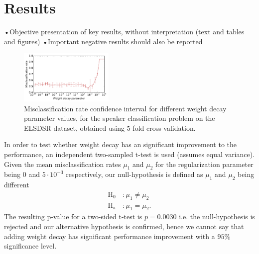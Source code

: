 \section{Results}

•Objective presentation of key results, without interpretation (text and tables
and figures)
•Important negative results should also be reported

\begin{figure}[H]
  \centering
  \includegraphics[width=0.4\textwidth]{plots/reg_opt_dieleman_speaker_elsdsr}
  \caption{Misclassification rate confidence interval for different weight decay parameter values, for the speaker classification problem on the ELSDSR dataset, obtained using $5$-fold cross-validation.}
  \label{fig:reg_opt}
\end{figure}

In order to test whether weight decay has an significant improvement to the performance, an independent two-sampled t-test is used (assumes equal variance). Given the mean misclassification rates $\mu_1$ and $\mu_2$ for the regularization parameter being $0$ and $5 \cdot 10^{-3}$ respectively, our null-hypothesis is defined as $\mu_1$ and $\mu_2$ being different
\begin{equation}
\begin{aligned}
\text{H}_\text{0} \, &\text{:} \, \mu_1 \ne \mu_2 \\
\text{H}_\text{a} \, &\text{:} \, \mu_1 = \mu_2.
\end{aligned}
\end{equation}
The resulting p-value for a two-sided t-test is $p = 0.0030$ i.e. the null-hypothesis is rejected and our alternative hypothesis is confirmed, hence we cannot say that adding weight decay has significant performance improvement with a $95\%$ significance level.

